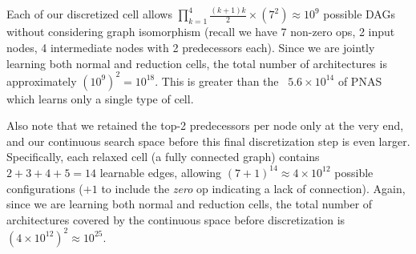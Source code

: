 \documentclass{article}
\begin{document}
Each of our discretized cell allows $\prod_{k=1}^4 \frac{(k+1)k}{2}\times (7^2) \approx 10^9$ possible DAGs without considering graph isomorphism (recall we have 7 non-zero ops, 2 input nodes, 4 intermediate nodes with 2 predecessors each). Since we are jointly learning both normal and reduction cells, the total number of architectures is approximately $(10^9)^2 = 10^{18}$. This is greater than the ~$5.6\times10^{14}$ of PNAS \citep{liu2017progressive} which learns only a single type of cell.

Also note that we retained the top-2 predecessors per node only at the very end, and our continuous search space before this final discretization step is even larger. Specifically, each relaxed cell (a fully connected graph) contains $2+3+4+5 = 14$ learnable edges, allowing $(7+1)^{14} \approx 4\times 10^{12}$ possible configurations ($+1$ to include the \emph{zero} op indicating a lack of connection). Again, since we are learning both normal and reduction cells, the total number of architectures covered by the continuous space before discretization is $(4\times 10^{12})^2 \approx 10^{25}$.
\end{document}

